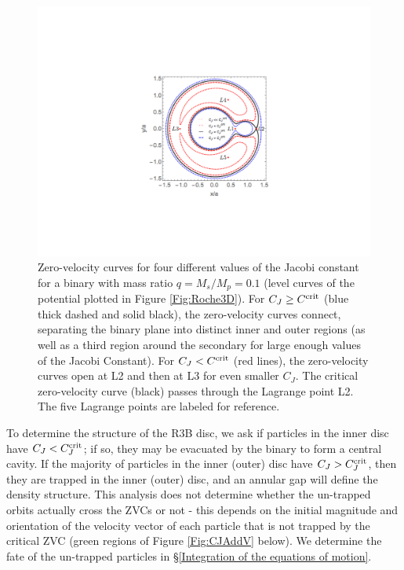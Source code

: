 \documentclass[usenatbib]{mnras}
\begin{document}
\begin{figure}
\begin{center}
\includegraphics[scale=0.55]{Crit_CJ_Curves_q0p1_L3crit.pdf} 
\end{center}
\caption{Zero-velocity curves for four different values of the Jacobi
  constant for a binary with mass ratio $q=M_s/M_p=0.1$ (level curves
  of the potential plotted in Figure \ref{Fig:Roche3D}). For $C_J
  \geq C^{\rm{crit}}$ (blue thick dashed and solid black), the
  zero-velocity curves connect, separating the binary plane into
  distinct inner and outer regions (as well as a third region around
  the secondary for large enough values of the Jacobi Constant). For
  $C_J < C^{\rm{crit}}$ (red lines), the zero-velocity curves open at
  L2 and then at L3 for even smaller $C_J$. The critical zero-velocity
  curve (black) passes through the Lagrange point L2. The five
  Lagrange points are labeled for reference.}
\label{Fig:CJ_Ex}
\end{figure}





To determine the structure of the R3B disc, we ask if particles in the
inner disc have $C_J < C^{\rm{crit}}_J$; if so, they may be evacuated
by the binary to form a central cavity. If the majority of particles
in the inner (outer) disc have $C_J > C^{\rm{crit}}_J$, then they are
trapped in the inner (outer) disc, and an annular gap will define the
density structure. This analysis does not determine whether the un-trapped orbits
actually cross the ZVCs or not - this depends on the initial magnitude
and orientation of the velocity vector of each particle that is not trapped by the 
critical ZVC (green regions of Figure \ref{Fig:CJAddV} below). We determine the 
fate of the un-trapped particles in \S\ref{Integration of the equations of motion}.
\end{document}
